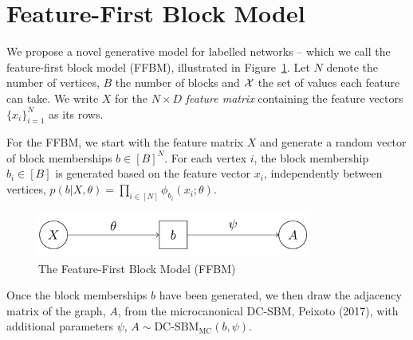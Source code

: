 \section{Feature-First Block Model}

We propose a novel generative model for labelled networks -- which we call the feature-first block model (FFBM),
illustrated in Figure~\ref{fig:ffbm}.
Let $N$ denote the number of vertices, $B$ the number of blocks
and ${\cal X}$ the set of values each feature can take.
We write $X$ for the $N\times D$ {\em feature matrix} containing
the feature vectors $\{x_i\}_{i=1}^{N}$ 
as its rows.

For the FFBM, we start with the feature matrix $X$ and generate a random
vector of block memberships $b \in [B]^N$. For each vertex $i$, the
block membership $b_i\in[B]$ is generated based on the feature
vector $x_i$, independently between vertices, 
$p(b| X, \theta) = \prod_{i \in [N]} \phi_{b_i} (x_i; \theta)$.
%
\begin{figure}[!ht]
	\centering
%		
	\includegraphics[width=0.8\textwidth]{img/ffbm.png}
	\caption{The Feature-First Block Model (FFBM)}
	\label{fig:ffbm}
\end{figure}

Once the block memberships $b$ have been generated, we then draw the 
adjacency matrix of the graph, $A$, from the microcanonical DC-SBM, Peixoto (2017), with additional parameters 
$\psi$,
$
	A \sim \textrm{DC-SBM}_{\textrm{MC}} (b, \psi).
	\label{eqn:A-generation}
$
